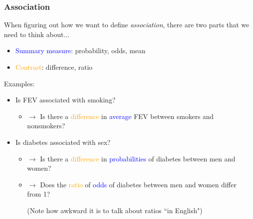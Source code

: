 \documentclass[12pt, 
hyperref={colorlinks=true, linkcolor=blue, urlcolor=cyan}]{beamer}
\begin{document}
\begin{frame}
\frametitle{Association}
When figuring out how we want to define \textit{association}, there are two parts that we need to think about...  \vspace{-0.3cm} \pause

\begin{itemize}
\item \textcolor{blue}{Summary measure}: probability, odds, mean
\item \textcolor{orange}{Contrast}: difference, ratio
\end{itemize} \pause

Examples: \vspace{-0.3cm}
\begin{itemize}
\item Is FEV associated with smoking? \pause
	\begin{itemize}
	\item[] $\rightarrow$ Is there a \textcolor{orange}{difference} in \textcolor{blue}{average} FEV between smokers and nonsmokers? \pause
	\end{itemize}
\item Is diabetes associated with sex? \pause
	\begin{itemize}
	\item[] $\rightarrow$ Is there a \textcolor{orange}{difference} in \textcolor{blue}{probabilities} of diabetes between men and women? \pause
	\item[] $\rightarrow$ Does the \textcolor{orange}{ratio} of \textcolor{blue}{odds} of diabetes between men and women differ from 1? \pause \begin{tiny}(Note how awkward it is to talk about ratios ``in English")\end{tiny}%
	\end{itemize}
\end{itemize}
\end{frame}
\end{document}

